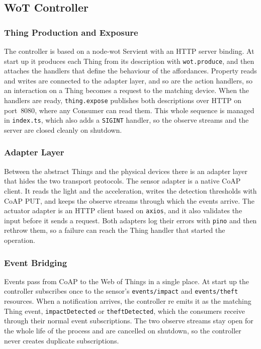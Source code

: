\documentclass[conference]{IEEEtran}
\begin{document}
\subsection{WoT Controller}

\subsubsection{Thing Production and Exposure}
The controller is based on a node-wot Servient with an HTTP server binding. At start up it produces each Thing from its description with \texttt{wot.produce}, and then attaches the handlers that define the behaviour of the affordances. Property reads and writes are connected to the adapter layer, and so are the action handlers, so an interaction on a Thing becomes a request to the matching device. When the handlers are ready, \texttt{thing.expose} publishes both descriptions over HTTP on port~$8080$, where any Consumer can read them. This whole sequence is managed in \texttt{index.ts}, which also adds a \texttt{SIGINT} handler, so the observe streams and the server are closed cleanly on shutdown.

\subsubsection{Adapter Layer}
Between the abstract Things and the physical devices there is an adapter layer that hides the two transport protocols. The sensor adapter is a native CoAP client. It reads the light and the acceleration, writes the detection thresholds with CoAP PUT, and keeps the observe streams through which the events arrive. The actuator adapter is an HTTP client based on \texttt{axios}, and it also validates the input before it sends a request. Both adapters log their errors with \texttt{pino} and then rethrow them, so a failure can reach the Thing handler that started the operation.

\subsubsection{Event Bridging}
Events pass from CoAP to the Web of Things in a single place. At start up the controller subscribes once to the sensor's \texttt{events/impact} and \texttt{events/theft} resources. When a notification arrives, the controller re emits it as the matching Thing event, \texttt{impactDetected} or \texttt{theftDetected}, which the consumers receive through their normal event subscriptions. The two observe streams stay open for the whole life of the process and are cancelled on shutdown, so the controller never creates duplicate subscriptions.
\end{document}
